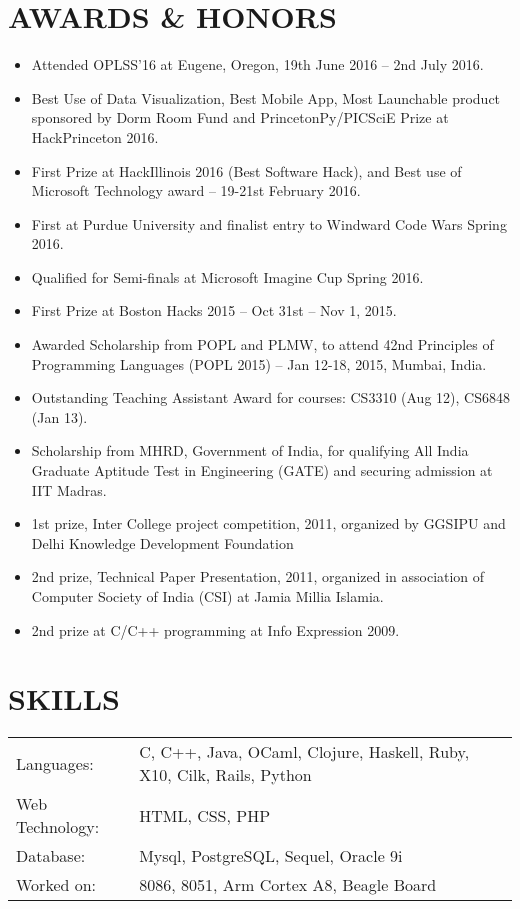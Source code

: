 \documentclass[10pt]{article}
\begin{document}
\section*{AWARDS \& HONORS}
\begin{itemize}
\itemsep-0.2em
\item Attended OPLSS'16 at Eugene, Oregon, 19th June 2016 – 2nd July 2016.
\item Best Use of Data Visualization, Best Mobile App, Most Launchable product sponsored by Dorm Room Fund and PrincetonPy/PICSciE Prize at HackPrinceton 2016.
\item First Prize at HackIllinois 2016 (Best Software Hack), and 
Best use of Microsoft Technology award – 19-21st February 2016.
\item First at Purdue University and finalist entry to Windward Code Wars Spring 2016.
\item Qualified for Semi-finals at Microsoft Imagine Cup Spring 2016.
\item First Prize at Boston Hacks 2015 – Oct 31st – Nov 1, 2015.
\item Awarded Scholarship from POPL and PLMW, to attend 42nd Principles of Programming
Languages (POPL 2015) -- Jan 12-18, 2015, Mumbai, India.
\item Outstanding Teaching Assistant Award for courses: CS3310 (Aug 12), CS6848 (Jan 13).
\item Scholarship from MHRD, Government of India, for qualifying All India Graduate
Aptitude Test in Engineering (GATE) and securing admission at IIT Madras.
\item 1st prize, Inter College project competition, 2011, organized by GGSIPU and Delhi
Knowledge Development Foundation
\item 2nd prize, Technical Paper Presentation, 2011, organized in association of Computer
Society of India (CSI) at Jamia Millia Islamia.
\item 2nd prize at C/C++ programming at Info Expression 2009.
\end{itemize}


\section*{SKILLS}
\begin{tabular}{ll}
Languages:	&	 C, C++, Java, OCaml, Clojure, Haskell, Ruby, X10, Cilk, Rails, Python	\\
Web Technology:	&	 HTML, CSS, PHP								\\
Database:	&	 Mysql, PostgreSQL, Sequel, Oracle 9i					\\
Worked on:	&	 8086, 8051, Arm Cortex A8, Beagle Board				\\
\end{tabular}
\end{document}
